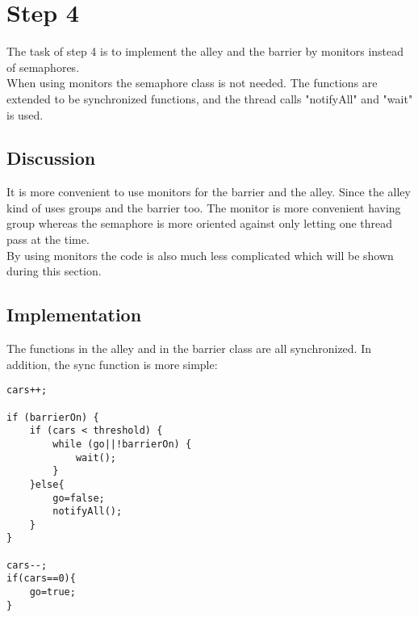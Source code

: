 \section{Step 4}
The task of step 4 is to implement the alley and the barrier by monitors instead of semaphores. \\
When using monitors the semaphore class is not needed. The functions are extended to be synchronized functions, and the thread calls "notifyAll" and "wait" is used.

\subsection{Discussion}
It is more convenient to use monitors for the barrier and the alley. Since the alley kind of uses groups and the barrier too. The monitor is more convenient having group whereas the semaphore is more oriented against only letting one thread pass at the time. \\
By using monitors the code is also much less complicated which will be shown during this section.

\subsection{Implementation}
The functions in the alley and in the barrier class are all synchronized. In addition, the sync function is more simple: 

\begin{lstlisting}
cars++;

if (barrierOn) {
	if (cars < threshold) {
		while (go||!barrierOn) {
			wait();	
		}
	}else{
		go=false;
		notifyAll();
	}
} 

cars--;
if(cars==0){
	go=true;
}
\end{lstlisting}


